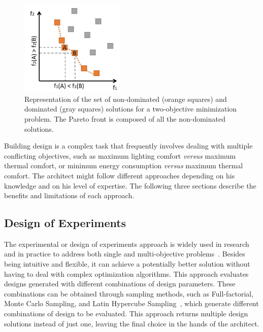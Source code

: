 \begin{figure}
\centering
\includegraphics[width=5cm]{Images/Background/pareto-front.JPG}
\caption[Example of a bi-objective optimization problem]{Representation of the set of non-dominated (orange squares) and dominated (gray squares) solutions for a two-objective minimization problem. The Pareto front is composed of all the non-dominated solutions.}
\label{fig:paretofrontier}
\end{figure}

Building design is a complex task that frequently involves dealing with multiple conflicting objectives, such as maximum lighting comfort \textit{versus} maximum thermal comfort, or minimum energy consumption \textit{versus} maximum thermal comfort. The architect might follow different approaches depending on his knowledge and on his level of expertise. The following three sections describe the benefits and limitations of each approach. 

\subsection{Design of Experiments}

The experimental or design of experiments approach is widely used in research and in practice to address both single and multi-objective problems~\cite{Fang2017}. Besides being intuitive and flexible, it can achieve a potentially better solution without having to deal with complex optimization algorithms. This approach evaluates designs generated with different combinations of design parameters. These combinations can be obtained through sampling methods, such as Full-factorial, Monte Carlo Sampling, and Latin Hypercube Sampling~\cite{Giunta2003DOE}, which generate different combinations of design to be evaluated. This approach returns multiple design solutions instead of just one, leaving the final choice in the hands of the architect.

